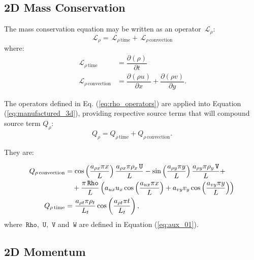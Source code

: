 \documentclass[10pt]{article}
\newcommand{\Diff}[2] {\dfrac{\partial( #1)}{\partial #2}}
\newcommand{\Rho}{\,\mathtt{Rho}}
\newcommand{\U}{\,\mathtt{U}}
\newcommand{\V}{\,\mathtt{V}}
\newcommand{\W}{\,\mathtt{W}}
\newcommand{\Lo}{\,\mathcal{L}}
\newcommand{\timee}{\,\text{time}}
\newcommand{\convection}{\,\text{convection}}
\begin{document}
\subsection{2D Mass Conservation}
The mass conservation equation may be written as an operator $\Lo_\rho$:
$$ \Lo_{\rho} = \Lo_{\rho \, \text{time}}+\Lo_{\rho \, \text{convection}}$$
where:
\begin{equation}
\begin{split}\label{eq:rho_operators}
\Lo_{\rho \, \text{time}}&=\Diff{\rho}{t} \\
\Lo_{\rho \, \text{convection}}&=\Diff{\rho u}{x}+\Diff{\rho v}{y} .
\end{split}
 \end{equation}

The operators defined in Eq. (\ref{eq:rho_operators}) are applied into Equation  (\ref{eq:manufactured_3d}), providing respective source terms that will compound source term $Q_{\rho}$:
\begin{equation*}
 Q_{\rho} = Q_{\rho \, \text{time}}+Q_{\rho \, \text{convection}}.
\end{equation*}


They are:

\begin{equation*}
\begin{split}
 Q_{\rho \convection} &= \cos\left(\dfrac{a_{\rho x} \pi x}{L}\right) \dfrac{a_{\rho x} \pi \rho_x \U}{L}-\sin\left(\dfrac{a_{\rho y} \pi y}{L}\right) \dfrac{a_{\rho y} \pi \rho_y \V}{L}+\\
	&\quad+\dfrac{\pi \Rho}{L} \left(a_{ux} u_x \cos\left(\dfrac{a_{ux} \pi x}{L}\right)+a_{vy} v_y \cos\left(\dfrac{a_{vy} \pi y}{L}\right)\right) \\ \vspace{15pt}
%
Q_{\rho \timee} &= \dfrac{a_{\rho t} \pi \rho_t }{L_t} \cos\left(\dfrac{a_{\rho t} \pi t}{L_t}\right) ,
\end{split}
\end{equation*}
where $\Rho,\,\U,\,\V$ and $\W$  are defined in Equation (\ref{eq:aux_01}).


\subsection{2D Momentum}


\end{document}
